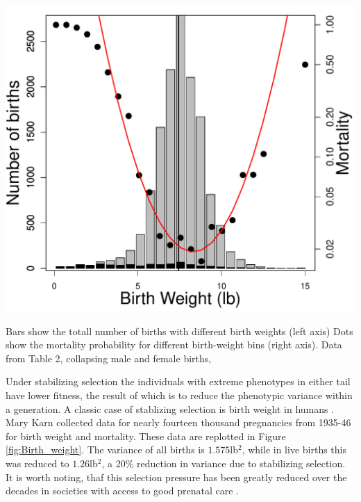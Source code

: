 \begin{marginfigure}
\begin{center}
\includegraphics[width= \textwidth]{Journal_figs/Quant_gen/birth_weight/Karn_Penrose_birth_weight.pdf}
\end{center}
\caption{Bars show the totall number of births with different birth
  weights (left axis)  Dots show the mortality probability for different
  birth-weight bins (right axis). Data from \citet{karn1951birth}
  Table 2, collapsing male and female births,  } \label{fig:Birth_weight}  
\end{marginfigure}

Under stabilizing selection the individuals with extreme phenotypes in
either tail have lower fitness, the result of which is to reduce the
phenotypic variance within a generation. A classic case of stablizing selection
is birth weight in humans \citep{karn1951birth}. Mary Karn collected
data for nearly fourteen thousand pregnancies from 1935-46 for birth
weight and mortality. These data are replotted in Figure
\ref{fig:Birth_weight}. The variance of all births is $1.575$lb$^2$, while in live births this
was reduced to $1.26$lb$^2$, a 20\% reduction in variance due to
stabilizing selection. It is worth noting, thaf this selection
pressure has been greatly reduced over the decades in societies with
access to good prenatal care \citep{ulizzi1992natural}.  %

